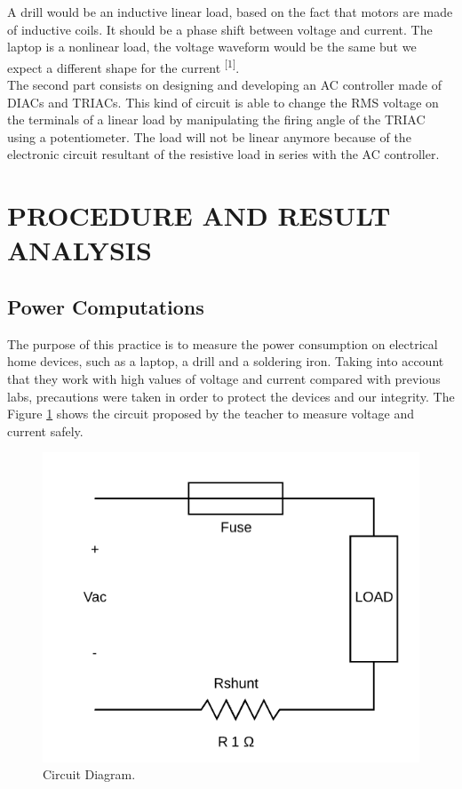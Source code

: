 \documentclass[journal]{IEEEtran}
\begin{document}
A drill would be an inductive linear load, based on 
the fact that motors are made of inductive coils. 
It should be a phase shift between voltage and current. 
The laptop is a nonlinear load, the voltage waveform 
would be the same but we expect a different shape for the 
current \textsuperscript{[1]}. \\

The second part consists on designing and developing 
an AC controller made of DIACs and TRIACs. This kind 
of circuit is able to change the RMS voltage on the 
terminals of a linear load by manipulating the 
firing angle of the TRIAC using a potentiometer. 
The load will not be linear anymore because of the 
electronic circuit resultant of the 
resistive load in series with the AC controller.\\


\section{PROCEDURE AND RESULT ANALYSIS}

\subsection{Power Computations}

The purpose of this practice is to measure the 
power consumption on electrical home devices, such 
as a laptop, a drill and a soldering iron. Taking into 
account that they work with high values of voltage 
and current compared with previous labs, precautions 
were taken in order to protect the devices and our 
integrity. The Figure \ref{circuit_diagram} 
shows the circuit proposed by the teacher to measure 
voltage and current safely. 

\begin{figure}[h]
\centering
\includegraphics[clip,width=0.75\columnwidth]{circuit_diagram.png}
\caption{Circuit Diagram.}
\label{circuit_diagram}
\end{figure}
\end{document}
